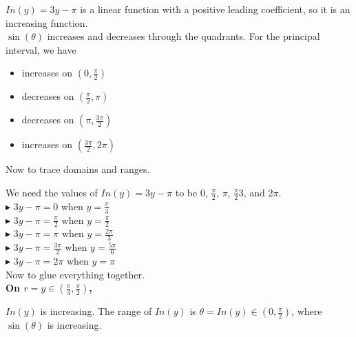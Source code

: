 \documentclass{ximera}
\begin{document}
$In(y) = 3y - \pi$ is a linear function with a positive leading coefficient, so it is an increasing function.\\


$\sin(\theta)$ increases and decreases through the quadrants. For the principal interval, we have


\begin{itemize}
  \item increases on $\left( 0, \frac{\pi}{2} \right)$
  \item decreases on $\left( \frac{\pi}{2}, \pi \right)$
  \item decreases on $\left( \pi, \frac{3\pi}{2} \right)$
  \item increases on $\left( \frac{3\pi}{2}, 2\pi \right)$
\end{itemize}


Now to trace domains and ranges.


We need the values of $In(y) = 3y - \pi$ to be $0$, $\frac{\pi}{2}$, $\pi$, $\frac{\pi}{2}3$, and $2\pi$. \\



$\blacktriangleright$ $3y - \pi = 0$ when $y = \frac{\pi}{3}$ \\

$\blacktriangleright$ $3y - \pi = \frac{\pi}{2}$ when $y = \frac{\pi}{2}$ \\

$\blacktriangleright$ $3y - \pi = \pi$ when $y = \frac{2\pi}{3}$ \\

$\blacktriangleright$ $3y - \pi = \frac{3\pi}{2}$ when $y = \frac{5\pi}{6}$ \\

$\blacktriangleright$ $3y - \pi = 2\pi$ when $y = \pi$ \\





Now to glue everything together. \\



\textbf{\textcolor{purple!80!black}{On $r = y \in \left( \frac{\pi}{3}, \frac{\pi}{2} \right)$, }}



$In(y)$ is increasing.  The range of $In(y)$ is $\theta = In(y) \in \left(0, \frac{\pi}{2} \right)$, where $\sin(\theta)$ is increasing. \\
\end{document}
